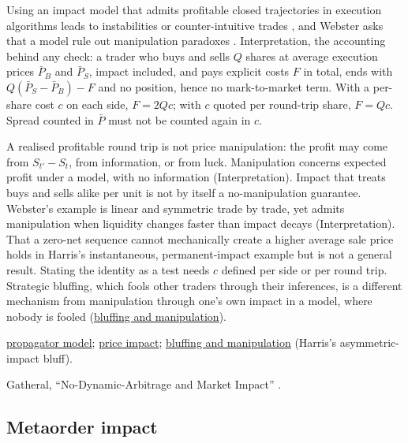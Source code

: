 \begin{qfresult}
 Using an impact model that admits profitable closed trajectories in execution algorithms leads to instabilities or counter-intuitive trades \citep[chap.~19, p.~362]{catalogue-0528}, and Webster asks that a model rule out manipulation paradoxes \citep[chap.~1, sec.~1.1.4, p.~8]{wide-webster-price-impact}. Interpretation, the accounting behind any check: a trader who buys and sells $Q$ shares at average execution prices $\bar P_B$ and $\bar P_S$, impact included, and pays explicit costs $F$ in total, ends with $Q(\bar P_S-\bar P_B)-F$ and no position, hence no mark-to-market term. With a per-share cost $c$ on each side, $F=2Qc$; with $c$ quoted per round-trip share, $F=Qc$. Spread counted in $\bar P$ must not be counted again in $c$.

 A realised profitable round trip is not price manipulation: the profit may come from $S_{t'}-S_t$, from information, or from luck. Manipulation concerns expected profit under a model, with no information (Interpretation). Impact that treats buys and sells alike per unit is not by itself a no-manipulation guarantee. Webster's example is linear and symmetric trade by trade, yet admits manipulation when liquidity changes faster than impact decays (Interpretation). That a zero-net sequence cannot mechanically create a higher average sale price holds in Harris's instantaneous, permanent-impact example but is not a general result. Stating the identity as a test needs $c$ defined per side or per round trip. Strategic bluffing, which fools other traders through their inferences, is a different mechanism from manipulation through one's own impact in a model, where nobody is fooled (\hyperref[def:bluffing-manipulation]{bluffing and manipulation}).

 \hyperref[mod:propagator]{propagator model}; \hyperref[def:price-impact]{price impact}; \hyperref[def:bluffing-manipulation]{bluffing and manipulation} (Harris's asymmetric-impact bluff).

 Gatheral, ``No-Dynamic-Arbitrage and Market Impact'' \citep{catalogue-0501}.

\end{qfresult}

\subsection{Metaorder impact}

